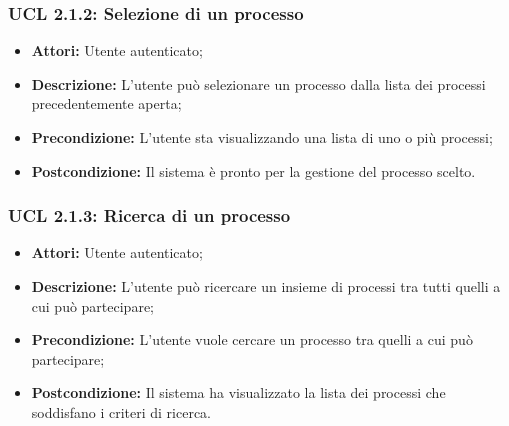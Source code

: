 \subsubsection{UCL 2.1.2: Selezione di un processo}
\begin{itemize}
\item \textbf{Attori:} Utente autenticato;
\item \textbf{Descrizione:} L'utente può selezionare un processo dalla lista dei processi precedentemente aperta;
\item \textbf{Precondizione:} L'utente sta visualizzando una lista di uno o più processi;
\item \textbf{Postcondizione:} Il sistema è pronto per la gestione del processo scelto.
\end{itemize}

\hypertarget{L2.1.3}{}
\subsubsection{UCL 2.1.3: Ricerca di un processo}
\begin{itemize}
\item \textbf{Attori:} Utente autenticato;
\item \textbf{Descrizione:} L'utente può ricercare un insieme di processi tra tutti quelli a cui può partecipare;
\item \textbf{Precondizione:} L'utente vuole cercare un processo tra quelli a cui può partecipare;
\item \textbf{Postcondizione:} Il sistema ha visualizzato la lista dei processi che soddisfano i criteri di ricerca.
\end{itemize}

\hypertarget{L2.2}{}
